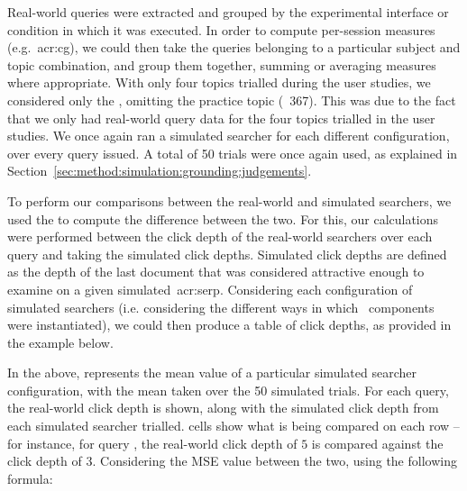 Real-world queries were extracted and grouped by the experimental interface or condition in which it was executed. In order to compute per-session measures (e.g.~\gls{acr:cg}), we could then take the queries belonging to a particular subject and topic combination, and group them together, summing or averaging measures where appropriate. With only four topics trialled during the user studies, we considered only the , omitting the practice topic (\textnumero~367). This was due to the fact that we only had real-world query data for the four topics trialled in the user studies. We once again ran a simulated searcher for each different configuration, over every query issued. A total of 50 trials were once again used, as explained in Section~\ref{sec:method:simulation:grounding:judgements}.

To perform our comparisons between the real-world and simulated searchers, we used the  to compute the difference between the two. For this, our calculations were performed between the click depth of the real-world searchers over each query and taking the simulated click depths. Simulated click depths are defined as the depth of the last document that was considered attractive enough to examine on a given simulated~\gls{acr:serp}. Considering each configuration of simulated searchers (i.e. considering the different ways in which \simiir~components were instantiated), we could then produce a table of click depths, as provided in the example below.

\begin{figure}[h]
    \centering
    \vspace*{-8mm}
\end{figure}

In the above,  represents the mean value of a particular simulated searcher configuration, with the mean taken over the 50 simulated trials. For each query, the real-world click depth is shown, along with the simulated click depth from each simulated searcher trialled.  cells show what is being compared on each row -- for instance, for query , the real-world click depth of $5$ is compared against the  click depth of $3$. Considering the MSE value between the two, using the following formula:

